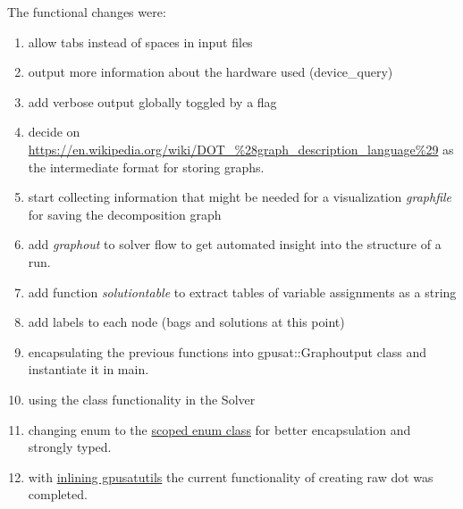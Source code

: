 \documentclass[a4paper, 12pt, bibliography=totoc]{scrartcl}
\begin{document}
The functional changes were:
\begin{enumerate}
	\item allow tabs instead of spaces in input files
	\item output more information about the hardware used (device\_query)
	\item add verbose output globally toggled by a flag 
	\item decide on \url{https://en.wikipedia.org/wiki/DOT_\%28graph_description_language\%29} 
		as the intermediate format for storing graphs.
	\item start collecting information that might be needed for a visualization
		\emph{graphfile} for saving the decomposition graph
	\item add \emph{graphout }to solver flow to get automated insight into the structure of a run.
	
	\item add function \emph{solutiontable} to extract tables of variable assignments as a string
	\item add labels to each node (bags and solutions at this point)
	\item encapsulating the previous functions into gpusat::Graphoutput class and instantiate it in main.
	\item using the class functionality in the Solver
	\item changing enum to the \href{https://coders-corner.net/2017/08/13/scoped-vs-unscoped-enum/}{scoped enum class} for better encapsulation and strongly typed.
	\item with \href{https://github.com/daajoe/GPUSAT/commit/cfb310}{inlining gpusatutils} the current functionality of creating raw dot was completed.
	

\end{enumerate}
\end{document}
